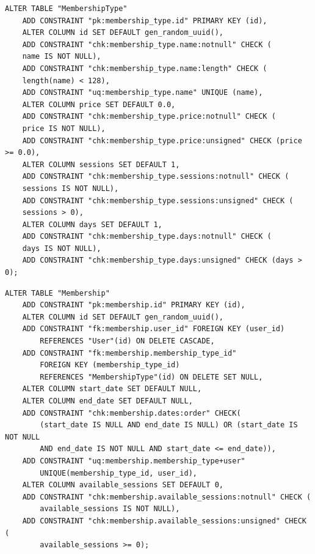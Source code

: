 \begin{lstlisting}[label=alg:19, caption=Реализация  ограничений целостности данных отношения MembershipType, captionpos=t]
ALTER TABLE "MembershipType"
	ADD CONSTRAINT "pk:membership_type.id" PRIMARY KEY (id),
	ALTER COLUMN id SET DEFAULT gen_random_uuid(),
	ADD CONSTRAINT "chk:membership_type.name:notnull" CHECK (
	name IS NOT NULL),
	ADD CONSTRAINT "chk:membership_type.name:length" CHECK (
	length(name) < 128),
	ADD CONSTRAINT "uq:membership_type.name" UNIQUE (name),
	ALTER COLUMN price SET DEFAULT 0.0,
	ADD CONSTRAINT "chk:membership_type.price:notnull" CHECK (
	price IS NOT NULL),
	ADD CONSTRAINT "chk:membership_type.price:unsigned" CHECK (price >= 0.0),
	ALTER COLUMN sessions SET DEFAULT 1,
	ADD CONSTRAINT "chk:membership_type.sessions:notnull" CHECK (
	sessions IS NOT NULL),
	ADD CONSTRAINT "chk:membership_type.sessions:unsigned" CHECK (
	sessions > 0),
	ALTER COLUMN days SET DEFAULT 1,
	ADD CONSTRAINT "chk:membership_type.days:notnull" CHECK (
	days IS NOT NULL),
	ADD CONSTRAINT "chk:membership_type.days:unsigned" CHECK (days > 0);
\end{lstlisting}

\begin{lstlisting}[label=alg:24, caption=Реализация  ограничений целостности данных отношения Membership, captionpos=t]
ALTER TABLE "Membership"
	ADD CONSTRAINT "pk:membership.id" PRIMARY KEY (id),
	ALTER COLUMN id SET DEFAULT gen_random_uuid(),
	ADD CONSTRAINT "fk:membership.user_id" FOREIGN KEY (user_id) 
		REFERENCES "User"(id) ON DELETE CASCADE,
	ADD CONSTRAINT "fk:membership.membership_type_id" 
		FOREIGN KEY (membership_type_id) 
		REFERENCES "MembershipType"(id) ON DELETE SET NULL,
	ALTER COLUMN start_date SET DEFAULT NULL,
	ALTER COLUMN end_date SET DEFAULT NULL,
	ADD CONSTRAINT "chk:membership.dates:order" CHECK(
		(start_date IS NULL AND end_date IS NULL) OR (start_date IS NOT NULL 
		AND end_date IS NOT NULL AND start_date <= end_date)),
	ADD CONSTRAINT "uq:membership.membership_type+user"
		UNIQUE(membership_type_id, user_id),
	ALTER COLUMN available_sessions SET DEFAULT 0,
	ADD CONSTRAINT "chk:membership.available_sessions:notnull" CHECK (
		available_sessions IS NOT NULL),
	ADD CONSTRAINT "chk:membership.available_sessions:unsigned" CHECK (
		available_sessions >= 0);
\end{lstlisting}


